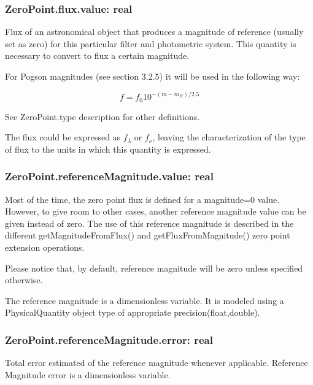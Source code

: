 \documentclass[11pt,a4paper]{ivoa}
\begin{document}
\subsubsection{ZeroPoint.flux.value: real}
Flux of an astronomical object that produces a magnitude of reference 
(usually set as zero) for this particular filter and photometric system. 
This quantity is necessary to convert to flux a certain magnitude.
\par

For Pogson magnitudes (see section 3.2.5) it will be used in the following way:
\par
\begin{equation} \label{eq:24}
f = f_0 10^{-(m-m_R )/2.5}
\end{equation}

See ZeroPoint.type description for other definitions.
\par

The flux could be expressed as $f_{\lambda}$ or $f_{\nu}$, leaving the 
characterization of the type of flux to the units in which this quantity 
is expressed.
\par

\subsubsection{ZeroPoint.referenceMagnitude.value: real}
Most of the time, the zero point flux is defined for a magnitude=0 value. 
However, to give room to other cases, another reference magnitude value can 
be given instead of zero. The use of this reference magnitude is described in 
the different getMagnitudeFromFlux() and getFluxFromMagnitude() zero point 
extension operations.
\par

Please notice that, by default, reference magnitude will be zero unless 
specified otherwise.
\par

The reference magnitude is a dimensionless variable. It is modeled using a 
PhysicalQuantity object type of appropriate precision(float,double).
\par

\subsubsection{ZeroPoint.referenceMagnitude.error: real}
Total error estimated of the reference magnitude whenever applicable. Reference 
Magnitude error is a dimensionless variable.\par
\end{document}
